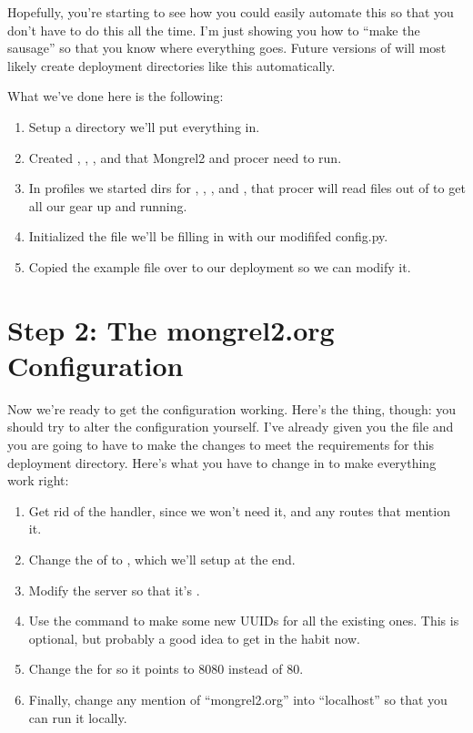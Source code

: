 Hopefully, you're starting to see how you could easily automate this so that you don't
have to do this all the time.  I'm just showing you how to ``make the sausage'' so that
you know where everything goes.  Future versions of  will most likely
create deployment directories like this automatically.

What we've done here is the following:

\begin{enumerate}
  \item Setup a  directory we'll put everything in.
  \item Created , , , and  that Mongrel2 and procer need to run.
  \item In profiles we started dirs for , , ,  and ,
    that procer will read files out of to get all our gear up and running.
  \item Initialized the  file we'll be filling in with our modififed config.py.
  \item Copied the  example file over to our deployment so we can modify it.
\end{enumerate}


\section{Step 2: The mongrel2.org Configuration}

Now we're ready to get the configuration working.  Here's the thing, though: you should
try to alter the configuration yourself.  I've already given you the file and you are
going to have to make the changes to meet the requirements for this deployment directory.
Here's what you have to change in  to make everything work right:

\begin{enumerate}
\item Get rid of the  handler, since we won't need it, and
    any routes that mention it.
\item Change the  of  to , which we'll setup at the end.
\item Modify the server  so that it's .
\item Use the  command to make some new UUIDs for all the
    existing ones.  This is optional, but probably a good idea to get in the
    habit now.
\item Change the  for  so it points to 8080 instead of 80.
\item Finally, change any mention of ``mongrel2.org'' into ``localhost'' so that you
    can run it locally.
\end{enumerate}

